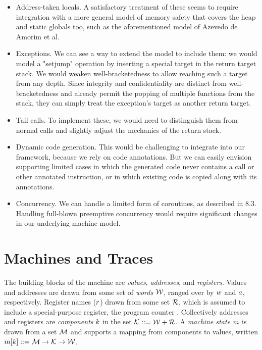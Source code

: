 \documentclass[10pt,conference]{ieeetran}%
\theoremstyle{definition}
\begin{document}
\begin{itemize}
\item Address-taken locals. A satisfactory
  treatment of these seems to require integration with a more general
  model of memory safety that covers the heap and static globals too,
  such as the aforementioned model of Azevedo de Amorim et al.

\item Exceptions. We can see a way to extend the model to include them:
  we would model a "setjump" operation by inserting a
  special target in the return target stack. We would weaken
  well-bracketedness to allow reaching such a target from any
  depth. Since integrity and confidentiality are distinct from
  well-bracketedness and already permit the popping of multiple
  functions from the stack, they can simply treat the exception's
  target as another return target.

\item Tail calls. To implement these, we would need to distinguish them
  from normal calls and slightly adjust the mechanics of the return stack.

\item Dynamic code generation. This would be challenging to
  integrate into our framework, because we rely on code annotations.
  But we can easily envision supporting limited cases in which
  the generated code never contains a call or other annotated instruction,
  or in which existing code is copied along with its annotations.

\item Concurrency. We can handle a limited form of coroutines, as described in
  8.3. Handling full-blown preemptive concurrency would require significant
  changes in our underlying machine model.
\end{itemize}

\section{Machines and Traces}
\label{sec:prelim}


The building blocks of the machine are {\em values}, {\em addresses}, and {\em registers}.
Values and addresses are drawn from some set of {\em words} \({\mathcal W}\), ranged over by \(w\) and
\(a\), respectively. Register names (\(r\)) drawn from some set
\({\mathcal R}\), which is assumed to include a special-purpose register, the
program counter {\PCname}. Collectively addresses and registers are {\em components} \(k\)
in the set \({\mathcal K} ::= {\mathcal W} + {\mathcal R}\).
%
A {\em machine state} \(m\) is drawn from a set \({\mathcal M}\) and supports a mapping
from components to values, written
\(m[k] ::= {\mathcal M} \rightarrow {\mathcal K} \rightarrow {\mathcal W} \).
\end{document}

